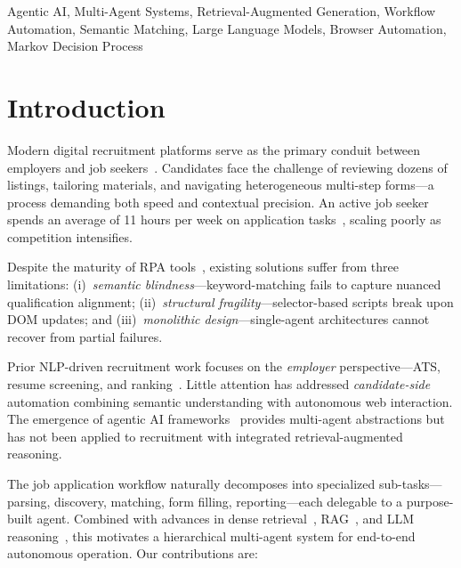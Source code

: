 \documentclass[conference]{IEEEtran}
\begin{document}
\begin{IEEEkeywords}
Agentic AI, Multi-Agent Systems, Retrieval-Augmented Generation, Workflow Automation, Semantic Matching, Large Language Models, Browser Automation, Markov Decision Process
\end{IEEEkeywords}

\section{Introduction}

Modern digital recruitment platforms serve as the primary conduit between employers and job seekers~\cite{linkedin2023}. Candidates face the challenge of reviewing dozens of listings, tailoring materials, and navigating heterogeneous multi-step forms---a process demanding both speed and contextual precision. An active job seeker spends an average of 11 hours per week on application tasks~\cite{jobsearch_time}, scaling poorly as competition intensifies.

Despite the maturity of RPA tools~\cite{aalst2018rpa}, existing solutions suffer from three limitations:
(i)~\emph{semantic blindness}---keyword-matching fails to capture nuanced qualification alignment;
(ii)~\emph{structural fragility}---selector-based scripts break upon DOM updates; and
(iii)~\emph{monolithic design}---single-agent architectures cannot recover from partial failures.

Prior NLP-driven recruitment work focuses on the \emph{employer} perspective---ATS, resume screening, and ranking~\cite{ats_survey}. Little attention has addressed \emph{candidate-side} automation combining semantic understanding with autonomous web interaction. The emergence of agentic AI frameworks~\cite{autogen2023,crewai2024} provides multi-agent abstractions but has not been applied to recruitment with integrated retrieval-augmented reasoning.

The job application workflow naturally decomposes into specialized sub-tasks---parsing, discovery, matching, form filling, reporting---each delegable to a purpose-built agent. Combined with advances in dense retrieval~\cite{karpukhin2020dpr}, RAG~\cite{lewis2020rag}, and LLM reasoning~\cite{openai2023gpt4}, this motivates a hierarchical multi-agent system for end-to-end autonomous operation. Our contributions are:
\end{document}
